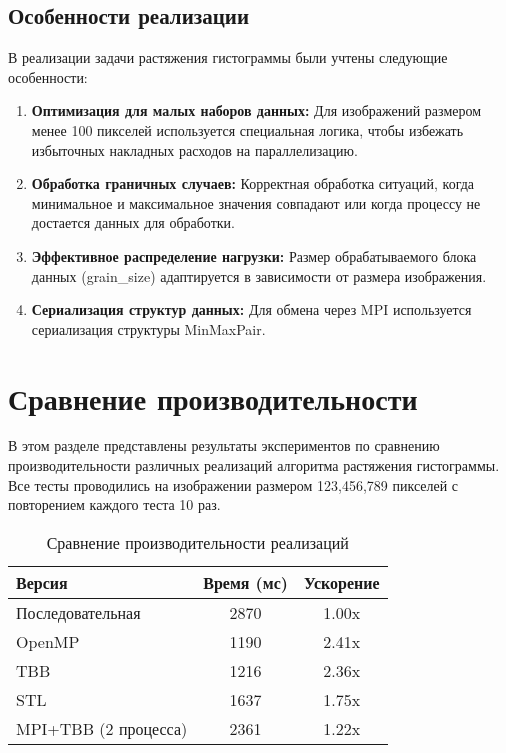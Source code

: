 \documentclass[a4paper,14pt]{article}
\begin{document}
\subsection{Особенности реализации}

В реализации задачи растяжения гистограммы были учтены следующие особенности:

\begin{enumerate}
    \item \textbf{Оптимизация для малых наборов данных:} Для изображений размером менее 100 пикселей 
    используется специальная логика, чтобы избежать избыточных накладных расходов на параллелизацию.
    
    \item \textbf{Обработка граничных случаев:} Корректная обработка ситуаций, когда минимальное 
    и максимальное значения совпадают или когда процессу не достается данных для обработки.
    
    \item \textbf{Эффективное распределение нагрузки:} Размер обрабатываемого блока данных (grain\_size) 
    адаптируется в зависимости от размера изображения.
    
    \item \textbf{Сериализация структур данных:} Для обмена через MPI используется сериализация 
    структуры MinMaxPair.
\end{enumerate}

\section{Сравнение производительности}

В этом разделе представлены результаты экспериментов по сравнению производительности различных 
реализаций алгоритма растяжения гистограммы. Все тесты проводились на изображении размером 
123,456,789 пикселей с повторением каждого теста 10 раз.

\begin{table}[h]
\centering
\caption{Сравнение производительности реализаций}
\label{tab:performance}
\begin{tabular}{lcc}
\toprule
Версия & Время (мс) & Ускорение \\
\midrule
Последовательная & 2870 & 1.00x \\
OpenMP & 1190 & 2.41x \\
TBB & 1216 & 2.36x \\
STL & 1637 & 1.75x \\
MPI+TBB (2 процесса) & 2361 & 1.22x \\
\bottomrule
\end{tabular}
\end{table}
\end{document}
